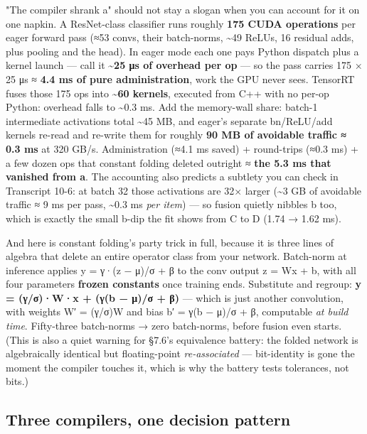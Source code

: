 "The compiler shrank a" should not stay a slogan when you can account for it on one napkin. A ResNet-class classifier runs roughly \textbf{175 CUDA operations} per eager forward pass (≈53 convs, their batch-norms, \textasciitilde{}49 ReLUs, 16 residual adds, plus pooling and the head). In eager mode each one pays Python dispatch plus a kernel launch — call it \textbf{\textasciitilde{}25 μs of overhead per op} — so the pass carries 175 × 25 μs ≈ \textbf{4.4 ms of pure administration}, work the GPU never sees. TensorRT fuses those 175 ops into \textbf{\textasciitilde{}60 kernels}, executed from C++ with no per-op Python: overhead falls to \textasciitilde{}0.3 ms. Add the memory-wall share: batch-1 intermediate activations total \textasciitilde{}45 MB, and eager's separate bn/ReLU/add kernels re-read and re-write them for roughly \textbf{90 MB of avoidable traffic ≈ 0.3 ms} at 320 GB/s. Administration (≈4.1 ms saved) + round-trips (≈0.3 ms) + a few dozen ops that constant folding deleted outright ≈ \textbf{the 5.3 ms that vanished from a}. The accounting also predicts a subtlety you can check in Transcript 10-6: at batch 32 those activations are 32× larger (\textasciitilde{}3 GB of avoidable traffic ≈ 9 ms per pass, \textasciitilde{}0.3 ms \textit{per item}) — so fusion quietly nibbles b too, which is exactly the small b-dip the fit shows from C to D (1.74 → 1.62 ms).

And here is constant folding's party trick in full, because it is three lines of algebra that delete an entire operator class from your network. Batch-norm at inference applies y = γ·(z − μ)/σ + β to the conv output z = Wx + b, with all four parameters \textbf{frozen constants} once training ends. Substitute and regroup: \textbf{y = (γ/σ)·W·x + (γ(b − μ)/σ + β)} — which is just another convolution, with weights W′ = (γ/σ)W and bias b′ = γ(b − μ)/σ + β, computable \textit{at build time}. Fifty-three batch-norms → zero batch-norms, before fusion even starts. (This is also a quiet warning for §7.6's equivalence battery: the folded network is algebraically identical but floating-point \textit{re-associated} — bit-identity is gone the moment the compiler touches it, which is why the battery tests tolerances, not bits.)

\subsection*{Three compilers, one decision pattern}

